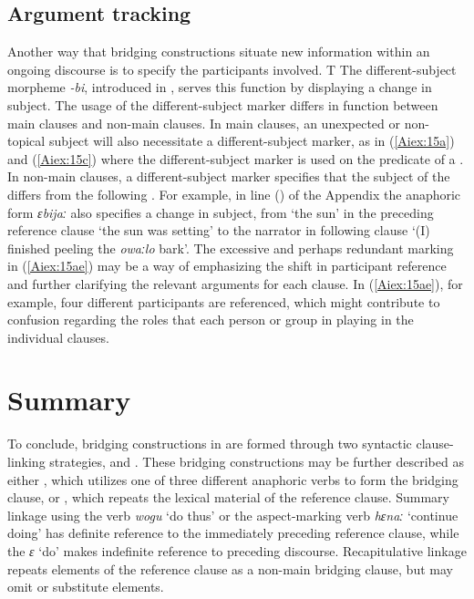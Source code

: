 \documentclass[output=paper]{LSP/langsci}
\begin{document}
\subsection{Argument tracking} 
\label{Aitracking}
Another way that bridging constructions situate new information within an ongoing discourse is to specify the participants involved. T
The different-subject morpheme  \textit{-bi}, introduced in , serves this function by displaying a change in subject. The usage of the different-subject marker differs in function between main clauses and non-main clauses. In main clauses, an unexpected or non-topical subject will also necessitate a different-subject marker, as in (\ref{Aiex:15a}) and (\ref{Aiex:15c}) where the different-subject marker is used on the predicate of a . In non-main clauses, a different-subject marker specifies that the subject of the  differs from the following . For example, in line () of the Appendix the anaphoric form \textit{ɛbijaː} also specifies a change in subject, from `the sun' in the preceding reference clause `the sun was setting' to the narrator in following clause `(I) finished peeling the \textit{owaːlo} bark'. The excessive and perhaps redundant  marking in (\ref{Aiex:15ae}) may be a way of emphasizing the shift in participant reference and further clarifying the relevant arguments for each clause. In (\ref{Aiex:15ae}), for example, four different participants are referenced, which might contribute to confusion regarding the roles that each person or group in playing in the individual clauses.

\section{Summary} 
\label{AiSumm}
To conclude, bridging constructions in  are formed through two syntactic clause-linking strategies,  and . These bridging constructions may be further described as either , which utilizes one of three different anaphoric verbs to form the bridging clause, or , which repeats the lexical material of the reference clause. Summary linkage using the verb \textit{wogu} `do thus' or the aspect-marking verb \textit{hɛnaː} `continue doing' has definite reference to the immediately preceding reference clause, while the  \textit{ɛ} `do' makes indefinite reference to preceding discourse. Recapitulative linkage repeats elements of the reference clause as a non-main bridging clause, but may omit or substitute elements. 
\end{document}
